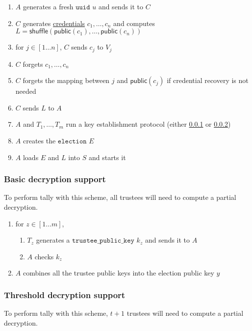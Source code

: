\documentclass[a4paper]{article}
\newcommand{\public}{\textsf{public}}
\newcommand{\shuffle}{\textsf{shuffle}}
\newcommand{\uuid}{\texttt{uuid}}
\newcommand{\tpk}{\texttt{trustee\_public\_key}}
\newcommand{\election}{\texttt{election}}
\begin{document}
\begin{enumerate}
\item $A$ generates a fresh \hyperref[basic-types]{$\uuid$} $u$ and
  sends it to $C$
\item $C$ generates \hyperref[credentials]{credentials}
  $c_1,\dots,c_n$ and computes
  $L=\shuffle(\public(c_1),\dots,\public(c_n))$
\item for $j\in[1\dots n]$, $C$ sends $c_j$ to $V_j$
\item $C$ forgets $c_1,\dots,c_n$
\item $C$ forgets the mapping between $j$ and $\public(c_j)$
  if credential recovery is not needed
\item $C$ sends $L$ to $A$
\item $A$ and $T_1,\dotsc,T_m$ run a key establishment protocol
  (either \ref{no-threshold} or \ref{threshold})
\item $A$ creates the \hyperref[elections]{$\election$} $E$
\item $A$ loads $E$ and $L$ into $S$ and starts it
\end{enumerate}

\subsubsection{Basic decryption support}
\label{no-threshold}

To perform tally with this scheme, all trustees will need to compute a
partial decryption.

\begin{enumerate}
\item for $z\in[1\dots m]$,
  \begin{enumerate}
  \item $T_z$ generates a \hyperref[trustee-keys]{$\tpk$} $k_z$ and
    sends it to $A$
  \item $A$ checks $k_z$
  \end{enumerate}
\item $A$ combines all the trustee public keys into the election
  public key $y$
\end{enumerate}

\subsubsection{Threshold decryption support}
\label{threshold}

To perform tally with this scheme, $t+1$ trustees will need to compute
a partial decryption.
\end{document}
